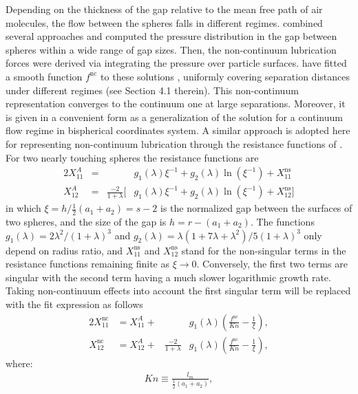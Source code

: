 \documentclass[../thesis.tex]{subfiles}
\begin{document}
Depending on the thickness of the gap relative to the mean free path of air molecules, the flow between the spheres falls in different regimes. \cite{SK96} combined several approaches and computed the pressure distribution in the gap between spheres within a wide range of gap sizes. Then, the non-continuum lubrication forces were derived via integrating the pressure over particle surfaces. \cite{DRK21a} have fitted a smooth function $f^\text{nc}$ to these solutions \citep{SK96}, uniformly covering separation distances under different regimes (see Section 4.1 therein). This non-continuum representation converges to the continuum one at large separations. Moreover, it is given in a convenient form as a generalization of the solution for a continuum flow regime in bispherical coordinates system. A similar approach is adopted here for representing non-continuum lubrication through the resistance functions of \cite{JO84}. For two nearly touching spheres the resistance functions \cite[Equations~(3.17) and (3.18) in][]{JO84} are
\begin{alignat}{2}
X^A_{11}&={}&&g_1(\lambda)\xi^{-1}+g_2(\lambda)\ln(\xi^{-1})+X^{\text{ns}}_{11} \\
X^A_{12}&={}&\frac{-2}{1+\lambda}\Big[&g_1(\lambda)\xi^{-1}+g_2(\lambda)\ln(\xi^{-1})+X^{\text{ns}}_{12}\Big]
\end{alignat}
in which $\xi = h / \frac{1}{2}(a_1+a_2)=s-2$ is the normalized gap between the surfaces of two spheres, and the size of the gap is $h=r-(a_1+a_2)$. The functions $g_1(\lambda)=2\lambda^2/(1+\lambda)^3$ and $g_2(\lambda)=\lambda(1+7\lambda+\lambda^2)/5(1+\lambda)^3$ only depend on radius ratio, and $X^{\text{ns}}_{11}$ and $X^{\text{ns}}_{12}$ stand for the non-singular terms in the resistance functions remaining finite as $\xi\to0$. Conversely, the first two terms are singular with the second term having a much slower logarithmic growth rate. Taking non-continuum effects into account \cite[analogous to Equations~(4.5) and (4.6) in][]{DRK21a} the first singular term will be replaced with the fit expression as follows
\begin{alignat}{2}
X^\text{nc}_{11}&=X^A_{11}+{}&&g_1(\lambda)\left(\frac{f^\text{nc}}{Kn}-\frac{1}{\xi}\right),\label{eq:nc11} \\
X^\text{nc}_{12}&=X^A_{12}+{}&\frac{-2}{1+\lambda}&g_1(\lambda)\left(\frac{f^\text{nc}}{Kn}-\frac{1}{\xi}\right),\label{eq:nc12}
\end{alignat}
where:
\begin{align}
Kn \equiv \frac{l_m}{\frac{1}{2}(a_1+a_2)},\label{eq:Kn}
\end{align}
\end{document}
